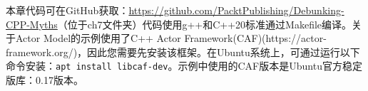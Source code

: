 本章代码可在GitHub获取：\url{https://github.com/PacktPublishing/Debunking-CPP-Myths}（位于ch7文件夹）代码使用g++和C++20标准通过Makefile编译。关于Actor Model的示例使用了C++ Actor Framework(CAF)(https://actor-framework.org/)，因此您需要先安装该框架。在Ubuntu系统上，可通过运行以下命令安装：\verb|apt install libcaf-dev|。示例中使用的CAF版本是Ubuntu官方稳定版库：0.17版本。
